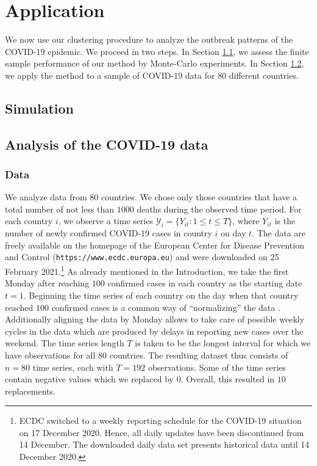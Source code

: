 \documentclass[a4paper,11pt]{article}
\numberwithin{equation}{section}
\begin{document}
\section{Application}\label{sec:app}

We now use our clustering procedure to analyze the outbreak patterns of the COVID-19 epidemic. We proceed in two steps. In Section \ref{subsec:sim}, we assess the finite sample performance of our method by Monte-Carlo experiments. In Section \ref{subsec:app}, we apply the method to a sample of COVID-19 data for $80$ different countries.

\subsection{Simulation}\label{subsec:sim}

\subsection{Analysis of the COVID-19 data}\label{subsec:app}

\subsubsection{Data}


We analyze data from $80$ countries. We chose only those countries that have a total number of not less than $1000$ deaths during the observed time period. For each country $i$, we observe a time series $\mathcal{Y}_i = \{ Y_{it}: 1 \le t \le T \}$, where $Y_{it}$ is the number of newly confirmed COVID-19 cases in country $i$ on day $t$. The data are freely available on the homepage of the European Center for Disease Prevention and Control (\texttt{https://www.ecdc.europa.eu}) and were downloaded on 25 February 2021.\footnote{ECDC switched to a weekly reporting schedule for the COVID-19 situation on 17 December 2020. Hence, all daily updates have been discontinued from 14 December. The downloaded daily data set presents historical data until 14 December 2020.} As already mentioned in the Introduction, we take the first Monday after reaching $100$ confirmed cases in each country as the starting date $t=1$. Beginning the time series of each country on the day when that country reached $100$ confirmed cases is a common way of ``normalizing'' the data \citep[see e.g.][]{Cohen2020}. Additionally aligning the data by Monday allows to take care of possible weekly cycles in the data which are produced by delays in reporting new cases over the weekend. The time series length $T$ is taken to be the longest interval for which we have observations for all $80$ countries. The resulting dataset thus consists of $n = 80$ time series, each with $T = 192$ observations. Some of the time series contain negative values which we replaced by $0$. Overall, this resulted in $10$ replacements. 

{\small
\setlength{\bibsep}{0.35em}
}
\end{document}
